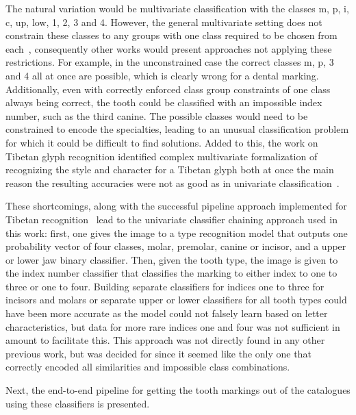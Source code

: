 \documentclass[english,twoside,openright]{UH_DS_MSc}
\begin{document}
The natural variation would be multivariate classification with the classes m, p, i, c, up, low, 1, 2, 3 and 4. However, 
the general multivariate setting does not constrain these classes to any groups with one class required to be chosen from 
each~\cite{multilabel_classification}, consequently other works would present approaches not applying these restrictions.
For example, in the unconstrained case the correct classes m, p, 3 and 4 all at 
once are possible, which is clearly wrong for a dental marking. Additionally, even with correctly enforced class group constraints of one class always being correct, the tooth could be classified with an impossible index number, such as the third canine.
The possible classes would need to be constrained to encode the specialties, leading to an unusual classification problem for which it could be difficult to 
find solutions. Added to this, the work on Tibetan glyph recognition identified complex multivariate formalization of 
recognizing the style and character for a Tibetan glyph both at once the main reason the resulting 
accuracies were not as good as in univariate classification~\cite{4zhaoTibetan}.

These shortcomings, along with the successful pipeline approach implemented for Tibetan recognition~\cite{4zhaoTibetan}
lead to the univariate classifier chaining approach used in this work: first, one gives the image to a type recognition 
model that outputs one probability vector of four classes, molar, premolar, canine or incisor, and a upper or lower jaw 
binary classifier. Then, given the tooth type, the image is given to the index number classifier that classifies the marking 
to either index to one to three or one to four. Building separate classifiers for indices one to three for incisors and molars
or separate upper or lower classifiers for all tooth types 
could have been more accurate as the model could not falsely learn based on letter characteristics, but data for more rare indices 
one and four was not sufficient in amount to facilitate this.
This approach was not directly found in any other previous work, but was decided 
for since it seemed like the only one that correctly encoded all similarities and impossible class combinations. 

Next, the end-to-end pipeline for getting the tooth markings out of the catalogues using these classifiers is presented.
\end{document}
